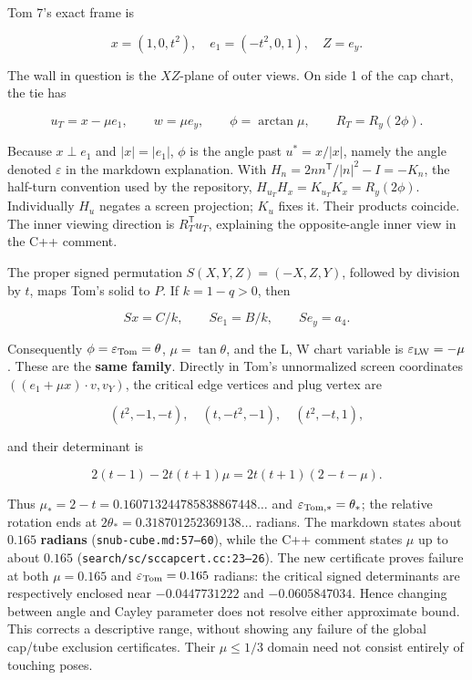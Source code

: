 \documentclass[
  10pt,
  a4paper,
]{article}
\begin{document}
Tom 7's exact frame is

\[x=(1,0,t^2),\quad e_1=(-t^2,0,1),\quad Z=e_y.\]

The wall in question is the \(XZ\)-plane of outer views. On side 1 of
the cap chart, the tie has

\[u_T=x-\mu e_1,\qquad w=\mu e_y,\qquad
\phi=\arctan\mu,\qquad R_T=R_y(2\phi).\]

Because \(x\perp e_1\) and \(|x|=|e_1|\), \(\phi\) is the angle past
\(u^*=x/|x|\), namely the angle denoted \(\varepsilon\) in the markdown
explanation. With \(H_n=2nn^{\mathsf T}/|n|^2-I=-K_n\), the half-turn
convention used by the repository, \(H_{u_T}H_x=K_{u_T}K_x=R_y(2\phi)\).
Individually \(H_u\) negates a screen projection; \(K_u\) fixes it.
Their products coincide. The inner viewing direction is
\(R_T^{\mathsf T}u_T\), explaining the opposite-angle inner view in the
C++ comment.

The proper signed permutation \(S(X,Y,Z)=(-X,Z,Y)\), followed by
division by \(t\), maps Tom's solid to \(P\). If \(k=1-q>0\), then

\[Sx=C/k,\qquad Se_1=B/k,\qquad Se_y=a_4.\]

Consequently \(\phi=\varepsilon_{\rm Tom}=\theta\), \(\mu=\tan\theta\),
and the L, W chart variable is \(\varepsilon_{\rm LW}=-\mu\). These are
the \textbf{same family}. Directly in Tom's unnormalized screen
coordinates \(((e_1+\mu x)\cdot v,v_Y)\), the critical edge vertices and
plug vertex are

\[(t^2,-1,-t),\quad(t,-t^2,-1),\quad(t^2,-t,1),\]

and their determinant is

\[2(t-1)-2t(t+1)\mu=2t(t+1)(2-t-\mu).\]

Thus \(\mu_*=2-t=0.160713244785838867448\ldots\) and
\(\varepsilon_{\rm Tom,*}=\theta_*\); the relative rotation ends at
\(2\theta_*=0.318701252369138\ldots\) radians. The markdown states about
\(0.165\) \textbf{radians} (\texttt{snub-cube.md:57–60}), while the C++
comment states \(\mu\) up to about \(0.165\)
(\texttt{search/sc/sccapcert.cc:23–26}). The new certificate proves
failure at both \(\mu=0.165\) and \(\varepsilon_{\rm Tom}=0.165\)
radians: the critical signed determinants are respectively enclosed near
\(-0.0447731222\) and \(-0.0605847034\). Hence changing between angle
and Cayley parameter does not resolve either approximate bound. This
corrects a descriptive range, without showing any failure of the global
cap/tube exclusion certificates. Their \(\mu\leq1/3\) domain need not
consist entirely of touching poses.
\end{document}

